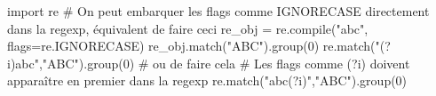 \begin{idleconsole*}[before skip=10pt]
	\begin{pyconsole}
import re
# On peut embarquer les flags comme IGNORECASE directement dans la regexp, équivalent de faire ceci
re_obj = re.compile("abc", flags=re.IGNORECASE)
re_obj.match("ABC").group(0)
re.match("(?i)abc","ABC").group(0) # ou de faire cela
# Les flags comme (?i) doivent apparaître en premier dans la regexp
re.match("abc(?i)","ABC").group(0)
	\end{pyconsole}
\end{idleconsole*}




